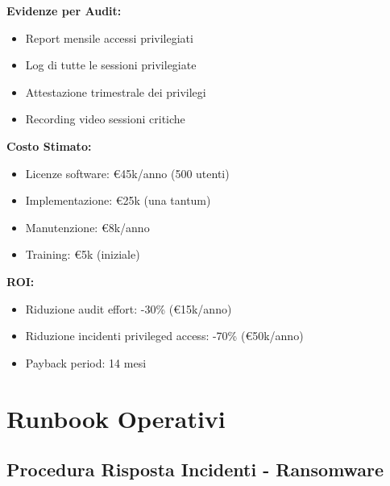 \begin{tcolorbox}
\textbf{Evidenze per Audit:}
\begin{itemize}
    \item Report mensile accessi privilegiati
    \item Log di tutte le sessioni privilegiate
    \item Attestazione trimestrale dei privilegi
    \item Recording video sessioni critiche
\end{itemize}

\textbf{Costo Stimato:}
\begin{itemize}
    \item Licenze software: €45k/anno (500 utenti)
    \item Implementazione: €25k (una tantum)
    \item Manutenzione: €8k/anno
    \item Training: €5k (iniziale)
\end{itemize}

\textbf{ROI:}
\begin{itemize}
    \item Riduzione audit effort: -30\% (€15k/anno)
    \item Riduzione incidenti privileged access: -70\% (€50k/anno)
    \item Payback period: 14 mesi
\end{itemize}
\end{tcolorbox}

\section{\texorpdfstring{Runbook Operativi}{D.3 - Runbook Operativi}}

\subsection{\texorpdfstring{Procedura Risposta Incidenti - Ransomware}{D.3.1 - Procedura Risposta Incidenti - Ransomware}}

